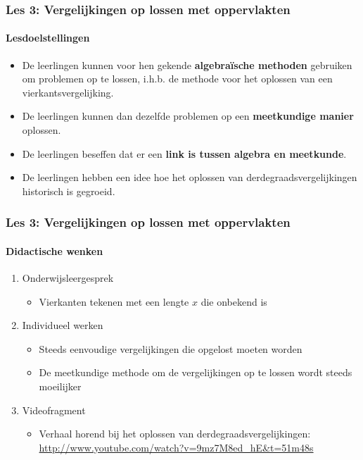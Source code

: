 \documentclass[dutch]{beamer}
\begin{document}
\begin{frame}
\frametitle{Les 3: Vergelijkingen op lossen met oppervlakten}
\framesubtitle{Lesdoelstellingen}
\begin{itemize}
  \item De leerlingen kunnen voor hen gekende {\bf algebra\"ische methoden} gebruiken om problemen op te lossen, i.h.b. de methode voor het oplossen van een vierkantsvergelijking.
  \item De leerlingen kunnen dan dezelfde problemen op een {\bf meetkundige manier} oplossen.
  \item De leerlingen beseffen dat er een {\bf link is tussen algebra en meetkunde}.
  \item De leerlingen hebben een idee hoe het oplossen van derdegraadsvergelijkingen historisch is gegroeid.
\end{itemize}
\end{frame}

\begin{frame}
  \frametitle{Les 3: Vergelijkingen op lossen met oppervlakten}
  \framesubtitle{Didactische wenken}
  \begin{enumerate}
    \item Onderwijsleergesprek
      \begin{itemize}
        \item Vierkanten tekenen met een lengte $x$ die onbekend is
      \end{itemize}
    \item Individueel werken
      \begin{itemize}
        \item Steeds eenvoudige vergelijkingen die opgelost moeten worden
        \item De meetkundige methode om de vergelijkingen op te lossen wordt steeds moeilijker
      \end{itemize}
    \item Videofragment
      \begin{itemize}
        \item Verhaal horend bij het oplossen van derdegraadsvergelijkingen:\\
          {\scriptsize \url{http://www.youtube.com/watch?v=9mz7M8ed_hE&t=51m48s}}
      \end{itemize}
  \end{enumerate}
\end{frame}


\end{document}
